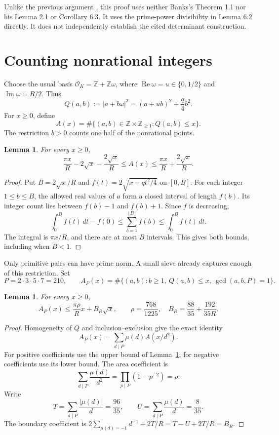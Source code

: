 \documentclass[11pt]{article}
\newtheorem{lemma}[theorem]{Lemma}
\newcommand{\Z}{\mathbb Z}
\newcommand{\OK}{\mathcal O_K}
\begin{document}
Unlike the previous argument \cite{v2}, this proof uses neither Banks's
Theorem 1.1 nor his Lemma 2.1 or Corollary 6.3. It uses the prime-power
divisibility in Lemma 6.2 directly. It does not independently establish
the cited determinant construction.

\section{Counting nonrational integers}

Choose the usual basis \(\OK=\Z+\Z\omega\), where
\(\operatorname{Re}\omega=u\in\{0,1/2\}\) and
\(\operatorname{Im}\omega=R/2\). Thus
\[
 Q(a,b):=|a+b\omega|^2=(a+ub)^2+\frac q4b^2.
\]
For \(x\ge0\), define
\[
 A(x)=\#\{(a,b)\in\Z\times\Z_{\ge1}:Q(a,b)\le x\}.
\]
The restriction \(b>0\) counts one half of the nonrational points.

\begin{lemma}\label{lattice}
For every \(x\ge0\),
\[
 \frac{\pi x}{R}-2\sqrt x-\frac{2\sqrt x}{R}
 \le A(x)\le
 \frac{\pi x}{R}+\frac{2\sqrt x}{R}.
\]
\end{lemma}
\begin{proof}
Put \(B=2\sqrt x/R\) and
\(f(t)=2\sqrt{x-qt^2/4}\) on \([0,B]\).
For each integer \(1\le b\le B\), the allowed real values of \(a\)
form a closed interval of length \(f(b)\). Its integer count lies
between \(f(b)-1\) and \(f(b)+1\). Since \(f\) is decreasing,
\[
 \int_0^B f(t)\,dt-f(0)
 \le\sum_{b=1}^{\lfloor B\rfloor}f(b)
 \le\int_0^B f(t)\,dt.
\]
The integral is \(\pi x/R\), and there are at most \(B\) intervals.
This gives both bounds, including when \(B<1\).
\end{proof}

Only primitive pairs can have prime norm. A small sieve already captures
enough of this restriction. Set
\[
 P=2\cdot3\cdot5\cdot7=210,\qquad
 A_P(x)=\#\{(a,b):b\ge1,\ Q(a,b)\le x,\ \gcd(a,b,P)=1\}.
\]

\begin{lemma}\label{primitive}
For every \(x\ge0\),
\[
 A_P(x)\le\frac{\pi\rho}{R}x+B_R\sqrt x,
 \qquad
 \rho=\frac{768}{1225},\quad
 B_R=\frac{88}{35}+\frac{192}{35R}.
\]
\end{lemma}
\begin{proof}
Homogeneity of \(Q\) and inclusion--exclusion give the exact identity
\[
 A_P(x)=\sum_{d\mid P}\mu(d)A(x/d^2).
\]
For positive coefficients use the upper bound of Lemma~\ref{lattice};
for negative coefficients use its lower bound. The area coefficient is
\[
 \sum_{d\mid P}\frac{\mu(d)}{d^2}
   =\prod_{p\mid P}(1-p^{-2})=\rho.
\]
Write
\[
 T=\sum_{d\mid P}\frac{|\mu(d)|}{d}=\frac{96}{35},\qquad
 U=\sum_{d\mid P}\frac{\mu(d)}d=\frac8{35}.
\]
The boundary coefficient is
\(2\sum_{\mu(d)=-1}d^{-1}+2T/R=T-U+2T/R=B_R\).
\end{proof}
\end{document}

